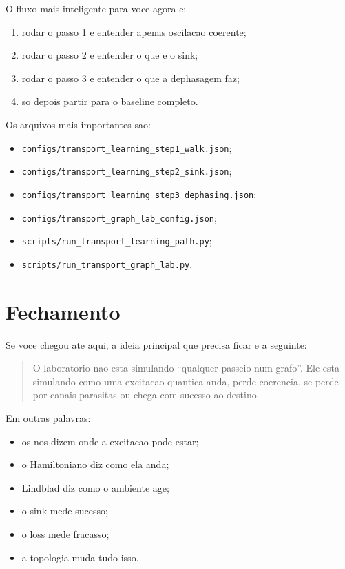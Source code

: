 \documentclass[11pt,a4paper]{article}
\begin{document}
O fluxo mais inteligente para voce agora e:
\begin{enumerate}
  \item rodar o passo 1 e entender apenas oscilacao coerente;
  \item rodar o passo 2 e entender o que e o sink;
  \item rodar o passo 3 e entender o que a dephasagem faz;
  \item so depois partir para o baseline completo.
\end{enumerate}

Os arquivos mais importantes sao:
\begin{itemize}
  \item \texttt{configs/transport\_learning\_step1\_walk.json};
  \item \texttt{configs/transport\_learning\_step2\_sink.json};
  \item \texttt{configs/transport\_learning\_step3\_dephasing.json};
  \item \texttt{configs/transport\_graph\_lab\_config.json};
  \item \texttt{scripts/run\_transport\_learning\_path.py};
  \item \texttt{scripts/run\_transport\_graph\_lab.py}.
\end{itemize}

\section{Fechamento}

Se voce chegou ate aqui, a ideia principal que precisa ficar e a seguinte:

\begin{quote}
O laboratorio nao esta simulando ``qualquer passeio num grafo''. Ele esta
simulando como uma excitacao quantica anda, perde coerencia, se perde por canais
parasitas ou chega com sucesso ao destino.
\end{quote}

Em outras palavras:
\begin{itemize}
  \item os nos dizem onde a excitacao pode estar;
  \item o Hamiltoniano diz como ela anda;
  \item Lindblad diz como o ambiente age;
  \item o sink mede sucesso;
  \item o loss mede fracasso;
  \item a topologia muda tudo isso.
\end{itemize}



\end{document}
